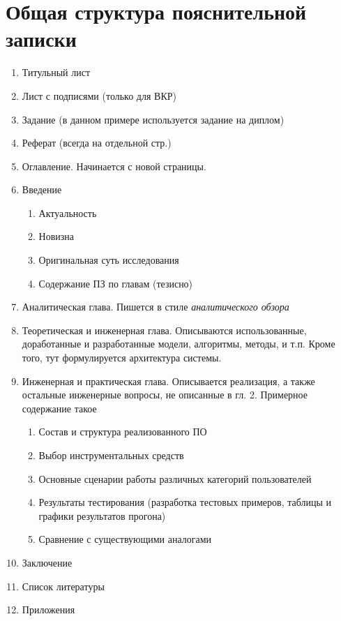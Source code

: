﻿\chapter{Общая структура пояснительной записки}\label{app-structure}

\begin{enumerate}
	\item Титульный лист %
	\item Лист с подписями (только для ВКР)
	\item Задание (в данном примере используется задание на диплом)
	\item Реферат (всегда на отдельной стр.)%
	\item Оглавление. Начинается с новой страницы. %
	\item Введение
	\begin{enumerate}
		\item Актуальность
		\item Новизна
		\item Оригинальная суть исследования
		\item Содержание ПЗ по главам (тезисно)
	\end{enumerate}
	\item Аналитическая глава. Пишется в стиле \textit{аналитического обзора}
	\item Теоретическая и инженерная глава. Описываются использованные, доработанные и разработанные модели, алгоритмы, методы, и т.п. Кроме того, тут формулируется архитектура системы.
	\item Инженерная и практическая глава. Описывается реализация, а также остальные инженерные вопросы, не описанные в гл. 2. Примерное содержание такое
	\begin{enumerate}
		\item Состав и структура реализованного ПО 
		\item Выбор инструментальных средств
		\item Основные сценарии работы различных категорий пользователей
		\item Результаты тестирования (разработка тестовых примеров, таблицы и графики результатов прогона)
		\item Сравнение с существующими аналогами
	\end{enumerate}
	\item Заключение
	\item Список литературы 
	\item Приложения
\end{enumerate}

